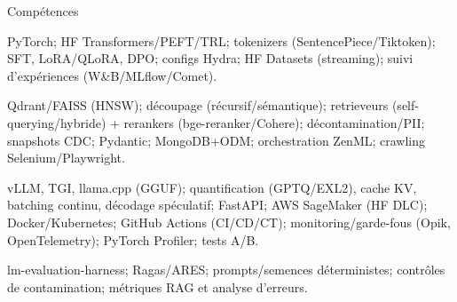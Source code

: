 \begin{rubric}{Compétences}
\noentry{~}

PyTorch; HF Transformers/PEFT/TRL; tokenizers (SentencePiece/Tiktoken); SFT, LoRA/QLoRA, DPO; configs Hydra; HF Datasets (streaming);
suivi d’expériences (W\&B/MLflow/Comet).

Qdrant/FAISS (HNSW); découpage (récursif/sémantique); retrieveurs (self-querying/hybride) + rerankers (bge-reranker/Cohere); décontamination/PII; snapshots CDC; Pydantic; MongoDB+ODM; orchestration ZenML; crawling Selenium/Playwright.

\entry*[MLOps]
vLLM, TGI, llama.cpp (GGUF); quantification (GPTQ/EXL2), cache KV, batching continu, décodage spéculatif; FastAPI; AWS SageMaker (HF DLC); Docker/Kubernetes; GitHub Actions (CI/CD/CT); monitoring/garde-fous (Opik, OpenTelemetry); PyTorch Profiler; tests A/B.

\entry*[Évaluation]
lm-evaluation-harness; Ragas/ARES; prompts/semences déterministes; contrôles de contamination; métriques RAG et analyse d’erreurs.

\end{rubric}

